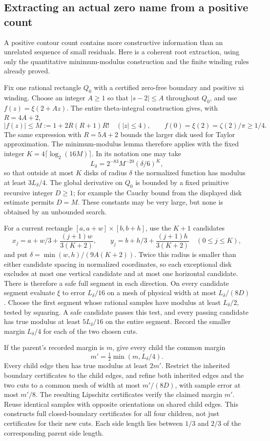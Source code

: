 \subsection{Extracting an actual zero name from a positive count}
\label{sec:zero-extraction}

A positive contour count contains more constructive information than an
unrelated sequence of small residuals. Here is a coherent root extraction,
using only the quantitative minimum-modulus construction and the finite
winding rules already proved.

Fix one rational rectangle $Q_0$ with a certified zero-free boundary and
positive xi winding. Choose an integer $A\ge1$ so that
$|s-2|\le A$ throughout $Q_0$, and use $f(z)=\xi(2+Az)$. The entire
theta-integral construction gives, with $R=4A+2$,
\[
        |f(z)|\le M:=1+2R(R+1)R!\quad(|z|\le4),
             \qquad f(0)=\xi(2)=\zeta(2)/\pi\ge1/4.
\]
The same expression with $R=5A+2$ bounds the larger disk used for Taylor
approximation. The minimum-modulus lemma therefore applies with the fixed
integer $K=4\lceil\log_2(16M)\rceil$. In its notation one may take
\[
       L_\delta=2^{-83}M^{-20}(\delta/6)^K,
\]
so that outside at most $K$ disks of radius $\delta$ the normalized
function has modulus at least $3L_\delta/4$. The global derivative on
$Q_0$ is bounded by a fixed primitive recursive integer $D\ge1$; for
example the Cauchy bound from the displayed disk estimate permits $D=M$.
These constants may be very large, but none is obtained by an unbounded
search.

For a current rectangle $[a,a+w]\times[b,b+h]$, use the $K+1$ candidates
\[
 x_j=a+w/3+\frac{(j+1)w}{3(K+2)},\qquad
 y_j=b+h/3+\frac{(j+1)h}{3(K+2)}\quad(0\le j\le K),
\]
and put $\delta=\min(w,h)/(9A(K+2))$. Twice this radius is smaller
than either candidate spacing in normalized coordinates, so each exceptional
disk excludes at most one vertical candidate and at most one horizontal
candidate. There is therefore a safe full segment in each direction.
On every candidate segment evaluate $\xi$ to error $L_\delta/16$ on a
mesh of physical width at most $L_\delta/(8D)$. Choose the first segment
whose rational samples have modulus at least $L_\delta/2$, tested by
squaring. A safe candidate passes this test, and every passing candidate
has true modulus at least $5L_\delta/16$ on the entire segment. Record
the smaller margin $L_\delta/4$ for each of the two chosen cuts.

If the parent's recorded margin is $m$, give every child the common margin
\[
                         m'=\tfrac12\min(m,L_\delta/4).
\]
Every child edge then has true
modulus at least $2m'$. Restrict the inherited boundary certificates
to the child edges, and refine both inherited edges and the two cuts to
a common mesh of width at most $m'/(8D)$, with sample error at most $m'/8$.
The resulting Lipschitz certificates verify the claimed margin $m'$.
Reuse
identical samples with opposite orientations on shared child edges. This
constructs full closed-boundary certificates for all four children, not
just certificates for their new cuts. Each side length lies between
$1/3$ and $2/3$ of the corresponding parent side length.

